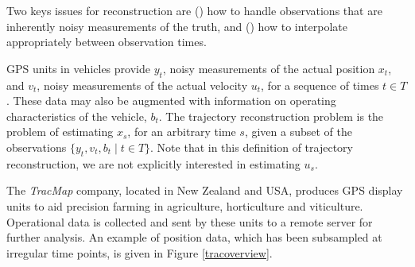 Two keys issues for reconstruction are () how to handle observations that are inherently noisy measurements of the truth, and () how to interpolate appropriately between observation times.

GPS units in vehicles provide $y_t$, noisy measurements of the actual position $x_t$, and $v_t$, noisy measurements of the actual velocity $u_t$, for a sequence of times $t\in T$. These data may also be augmented with information on operating characteristics of the vehicle, $b_t$. The trajectory reconstruction problem is the problem of estimating $x_s$, for an arbitrary time $s$, given a subset of the observations $\{y_t,v_t,b_t\mid t\in T\}$. Note that in this definition of trajectory reconstruction, we are not explicitly interested in estimating $u_s$.


The \textit{TracMap} company, located in New Zealand and USA, produces GPS display units to aid precision farming in agriculture, horticulture and viticulture. Operational data is collected and sent by these units to a remote server for further analysis. An example of position data, which has been subsampled at irregular time points, is given in Figure \ref{tracoverview}. 

